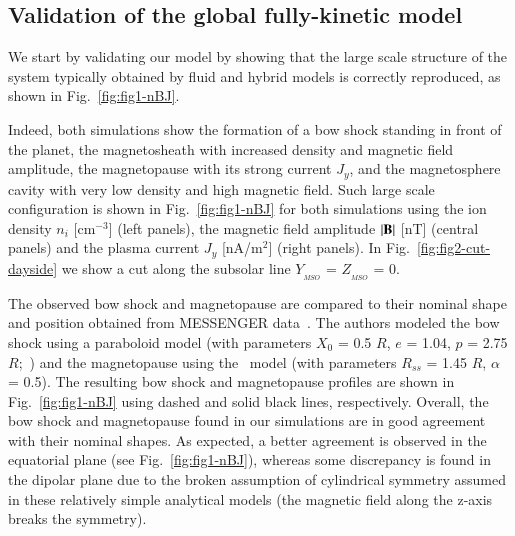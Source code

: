 \documentclass{aa}
\begin{document}
\subsection{Validation of the global fully-kinetic model}

We start by validating our model by showing that the large scale structure of the system typically obtained by fluid and hybrid models is correctly reproduced, as shown in Fig.~\ref{fig:fig1-nBJ}.

Indeed, both simulations show the formation of a bow shock standing in front of the planet, the magnetosheath with increased density and magnetic field amplitude, the magnetopause with its strong current $J_y$, and the magnetosphere cavity with very low density and high magnetic field. Such large scale configuration is shown in Fig.~\ref{fig:fig1-nBJ} for both simulations using the ion density $n_i$ [cm$^{-3}$] (left panels), the magnetic field amplitude $|\bf{B}|$ [nT] (central panels) and the plasma current $J_y$ [nA/m$^2$] (right panels). In Fig.~\ref{fig:fig2-cut-dayside} we show a cut along the subsolar line $Y_{_{MSO}}$ = $Z_{_{MSO}}$ = 0.

The observed bow shock and magnetopause are compared to their nominal shape and position obtained from MESSENGER data~\citep{Winslow2013}. The authors modeled the bow shock using a paraboloid model (with parameters $X_0$ = 0.5 $R$, $e$ = 1.04, $p$ = 2.75 $R$;~\citealt{Slavin2009}) and the magnetopause using the~\citet{Shue1997} model (with parameters $R_{ss}$ = 1.45 $R$, $\alpha$ = 0.5).
The resulting bow shock and magnetopause profiles are shown in Fig.~\ref{fig:fig1-nBJ} using dashed and solid black lines, respectively. 
Overall, the bow shock and magnetopause found in our simulations are in good agreement with their nominal shapes. As expected, a better agreement is observed in the equatorial plane (see Fig.~\ref{fig:fig1-nBJ}), whereas some discrepancy is found in the dipolar plane due to the broken assumption of cylindrical symmetry assumed in these relatively simple analytical models (the magnetic field along the z-axis breaks the symmetry).
\end{document}
